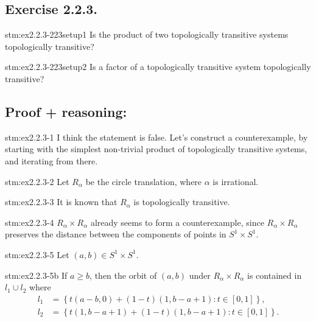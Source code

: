 \subsection*{Exercise 2.2.3.}

\begin{exercise}{stm:ex2.2.3-223setup1}
Is the product of two topologically transitive systems topologically transitive?
\end{exercise}

\begin{exercise}{stm:ex2.2.3-223setup2}
Is a factor of a topologically transitive system topologically transitive?
\end{exercise}

\subsection*{Proof {\color{blue}+ reasoning}:}

\begin{explanation}{stm:ex2.2.3-1}
I think the statement is false. Let's construct a counterexample, by starting with the simplest non-trivial product of topologically transitive systems, and iterating from there.
\end{explanation}

\begin{statement}{stm:ex2.2.3-2}
Let $R_\alpha$ be the circle translation, where $\alpha$ is irrational.
\end{statement}

\begin{statement}{stm:ex2.2.3-3}
It is known that $R_\alpha$ is topologically transitive.
\end{statement}

\begin{explanation}{stm:ex2.2.3-4}
$R_\alpha \times R_\alpha$ already seems to form a counterexample, since $R_\alpha \times R_\alpha$ preserves the distance between the components of points in $S^1 \times S^1$.
\end{explanation}

\begin{statement}{stm:ex2.2.3-5}
Let $(a,b) \in S^1 \times S^1$. 
\end{statement}

\begin{statement}{stm:ex2.2.3-5b}
If $a \geq b$, then the orbit of $(a,b)$ under $R_\alpha \times R_\alpha$ is contained in $l_1 \cup l_2$ where
\begin{align*}
l_1 &= \left\{ t(a-b,0) + (1 - t)(1, b-a+1) : t \in [0,1] \right\}, \\
l_2 &= \left\{ t(1, b-a+1) + (1 - t)(1, b-a+1) : t \in [0,1] \right\}.
\end{align*}
\end{statement}

